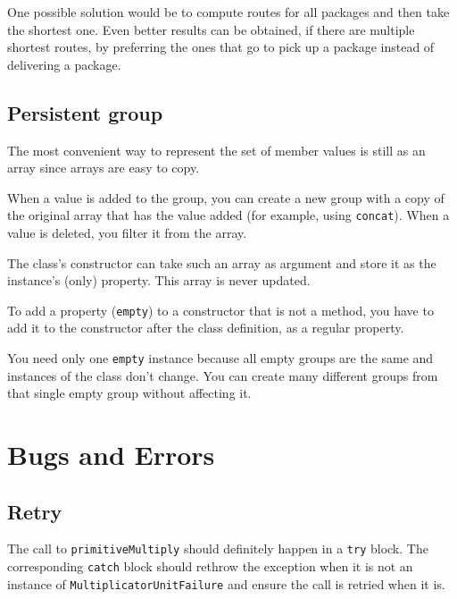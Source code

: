 One possible solution would be to compute routes for all packages and then take the shortest one. Even better results can be obtained, if there are multiple shortest routes, by preferring the ones that go to pick up a package instead of delivering a package.

\subsection{Persistent group}

The most convenient way to represent the set of member values is still as an array since arrays are easy to copy.

When a value is added to the group, you can create a new group with a copy of the original array that has the value added (for example, using \lstinline`concat`). When a value is deleted, you filter it from the array.

The class's constructor can take such an array as argument and store it as the instance's (only) property. This array is never updated.

To add a property (\lstinline`empty`) to a constructor that is not a method, you have to add it to the constructor after the class definition, as a regular property.

You need only one \lstinline`empty` instance because all empty groups are the same and instances of the class don't change. You can create many different groups from that single empty group without affecting it.

\section{Bugs and Errors}

\subsection{Retry}

The call to \lstinline`primitiveMultiply` should definitely happen in a \lstinline`try` block. The corresponding \lstinline`catch` block should rethrow the exception when it is not an instance of \lstinline`MultiplicatorUnitFailure` and ensure the call is retried when it is.

